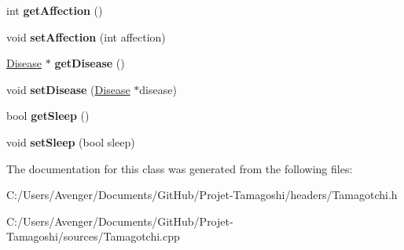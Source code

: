 \begin{DoxyCompactItemize}
\item 
\hypertarget{class_tamagotchi_a3d64a17bf0f8d1e7a6c266953c8de2b6}{int {\bfseries get\+Affection} ()}\label{class_tamagotchi_a3d64a17bf0f8d1e7a6c266953c8de2b6}

\item 
\hypertarget{class_tamagotchi_a01e4afe15b15c83f60c0dbff9e108a00}{void {\bfseries set\+Affection} (int affection)}\label{class_tamagotchi_a01e4afe15b15c83f60c0dbff9e108a00}

\item 
\hypertarget{class_tamagotchi_a34be0b6dfa2de022b019b940c97f9729}{\hyperlink{class_disease}{Disease} $\ast$ {\bfseries get\+Disease} ()}\label{class_tamagotchi_a34be0b6dfa2de022b019b940c97f9729}

\item 
\hypertarget{class_tamagotchi_a110dc641da8108b5c6f62b5662e91eda}{void {\bfseries set\+Disease} (\hyperlink{class_disease}{Disease} $\ast$disease)}\label{class_tamagotchi_a110dc641da8108b5c6f62b5662e91eda}

\item 
\hypertarget{class_tamagotchi_a65c02b87cd08ead932cff2a4c5b9d6e7}{bool {\bfseries get\+Sleep} ()}\label{class_tamagotchi_a65c02b87cd08ead932cff2a4c5b9d6e7}

\item 
\hypertarget{class_tamagotchi_a6e10ff0e6a6f4ba5c3a1b6aee5b3e0d0}{void {\bfseries set\+Sleep} (bool sleep)}\label{class_tamagotchi_a6e10ff0e6a6f4ba5c3a1b6aee5b3e0d0}

\end{DoxyCompactItemize}


The documentation for this class was generated from the following files\+:\begin{DoxyCompactItemize}
\item 
C\+:/\+Users/\+Avenger/\+Documents/\+Git\+Hub/\+Projet-\/\+Tamagoshi/headers/Tamagotchi.\+h\item 
C\+:/\+Users/\+Avenger/\+Documents/\+Git\+Hub/\+Projet-\/\+Tamagoshi/sources/Tamagotchi.\+cpp\end{DoxyCompactItemize}
